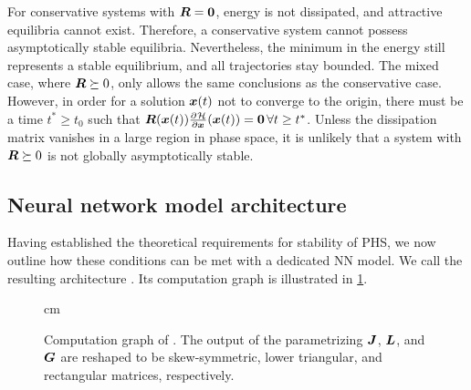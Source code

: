 For conservative systems with $\boldsymbol{R}=\boldsymbol{0}$, energy is not dissipated, and attractive equilibria cannot exist. Therefore, a conservative system cannot possess asymptotically stable equilibria. Nevertheless, the minimum in the energy still represents a stable equilibrium, and all trajectories stay bounded.
The mixed case, where $\boldsymbol{R}\succeq0$, only allows the same conclusions as the conservative case. However, in order for a solution $\boldsymbol{x}(t)$ not to converge to the origin, there must be a time $t^*\geq t_0$ such that $\boldsymbol{R}(\boldsymbol{x}(t))\frac{\partial^{}{\mathcal{H}}}{\partial\boldsymbol{x}^{}}(\boldsymbol{x}(t))=\boldsymbol{0}\,\forall t\geq t^*$. Unless the dissipation matrix vanishes in a large region in phase space, it is unlikely that a system with $\boldsymbol{R}\succeq0$ is not globally asymptotically stable.

\subsection{Neural network model architecture}

Having established the theoretical requirements for stability of \gls{PHS}, we now outline how these conditions can be met with a dedicated \gls{NN} model. We call the resulting architecture \sPHNN. Its computation graph is illustrated in \cref{fig:sPHNN_architecture}.

\begin{figure}[t]
        \begin{center}
        \caption{Computation graph of \sPHNN. The output of the  parametrizing $\boldsymbol{J}$, $\boldsymbol{L}$, and $\boldsymbol{G}$ are reshaped to be skew-symmetric, lower triangular, and rectangular matrices, respectively.}
    \label{fig:sPHNN_architecture}
    \end{center}
     cm
\end{figure}

